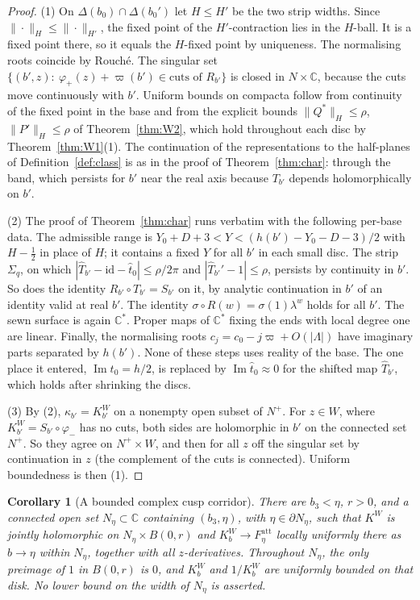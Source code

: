 \documentclass[11pt,a4paper]{article}
\newtheorem{corollary}[theorem]{Corollary}
\theoremstyle{definition}
\newcommand{\Rr}{R}
\newcommand{\Kk}{K}
\begin{document}
\begin{proof}
(1) On $\Delta(b_0)\cap\Delta(b_0')$ let $H\le H'$ be the two strip widths.
Since $\|\cdot\|_H\le\|\cdot\|_{H'}$, the fixed point of the $H'$-contraction
lies in the $H$-ball.  It is a fixed point there, so it equals the
$H$-fixed point by uniqueness.  The normalising roots coincide by Rouch\'e.
The singular set $\{(b',z):\ \varphi_+(z)+\varpi(b')\in\text{cuts of }\Rr_{b'}\}$
is closed in $N\times\mathbb C$, because the cuts move continuously with $b'$.  Uniform bounds on compacta follow
from continuity of the fixed point in the base and from the explicit bounds
$\|Q^*\|_H\le\rho$, $\|P'\|_H\le\rho$ of Theorem~\ref{thm:W2}, which hold
throughout each disc by Theorem~\ref{thm:W1}(1).  The continuation of the
representations to the half-planes of Definition~\ref{def:class} is as in the
proof of Theorem~\ref{thm:char}: through the band, which persists for $b'$
near the real axis because $T_{b'}$ depends holomorphically on $b'$.

(2) The proof of Theorem~\ref{thm:char} runs verbatim with the following
per-base data.  The admissible range is
$Y_0+D+3<Y<(h(b')-Y_0-D-3)/2$ with $H-\tfrac12$ in place of $H$; it contains a
fixed $Y$ for all $b'$ in each small disc.  The strip $\Sigma_q$, on which
$|\hat T_{b'}-\mathrm{id}-\hat t_0|\le\rho/2\pi$ and $|\hat T_{b'}'-1|\le\rho$, persists
by continuity in $b'$.  So does the identity $\Rr_{b'}\circ T_{b'}=S_{b'}$ on
it, by analytic continuation in $b'$ of an identity valid at real $b'$.  The identity $\sigma\circ\Rr(w)=\sigma(1)\lambda^w$
holds for all $b'$.  The sewn surface is again $\mathbb C^*$.  Proper maps of
$\mathbb C^*$ fixing the ends with local degree one are linear.  Finally, the
normalising roots $c_j=c_0-j\varpi+O(|\Lambda|)$ have imaginary parts
separated by $h(b')$.  None of these steps uses reality of the base.  The one place it entered,
$\operatorname{Im}t_0=h/2$, is replaced by $\operatorname{Im}\hat t_0\approx0$ for the
shifted map $\hat T_{b'}$, which holds after shrinking the discs.

(3) By (2), $\kappa_{b'}=\Kk^W_{b'}$ on a nonempty open subset of $N^+$.  For
$z\in W$, where $\Kk^W_{b'}=S_{b'}\circ\varphi_-$ has no cuts, both sides are
holomorphic in $b'$ on the connected set $N^+$.  So they agree on
$N^+\times W$, and then for all $z$ off the singular set by continuation
in $z$ (the complement of the cuts is connected).  Uniform boundedness is then (1).
\end{proof}

\begin{corollary}[A bounded complex cusp corridor]\label{cor:cusp-corridor}
There are $b_3<\eta$, $r>0$, and a connected open set
$N_\eta\subset\mathbb C$ containing $(b_3,\eta)$, with
$\eta\in\partial N_\eta$, such that $\Kk^W$ is jointly holomorphic on
$N_\eta\times B(0,r)$ and
$\Kk_b^W\to F_\eta^{\mathrm{att}}$ locally uniformly there as
$b\to\eta$ within $N_\eta$, together with all $z$-derivatives.
Throughout $N_\eta$, the only preimage of $1$ in $B(0,r)$ is $0$,
and $\Kk_b^W$ and $1/\Kk_b^W$ are uniformly bounded on that disk.
No lower bound on the width of $N_\eta$ is asserted.
\end{corollary}
\end{document}

